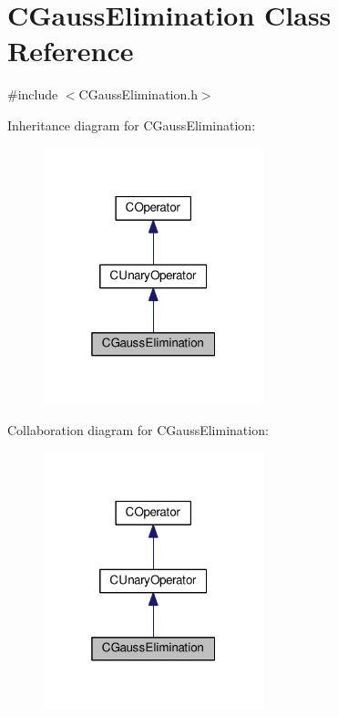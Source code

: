 \hypertarget{classCGaussElimination}{}\section{C\+Gauss\+Elimination Class Reference}
\label{classCGaussElimination}


{\ttfamily \#include $<$C\+Gauss\+Elimination.\+h$>$}



Inheritance diagram for C\+Gauss\+Elimination\+:\nopagebreak
\begin{figure}[H]
\begin{center}
\leavevmode
\includegraphics[width=181pt]{classCGaussElimination__inherit__graph}
\end{center}
\end{figure}


Collaboration diagram for C\+Gauss\+Elimination\+:\nopagebreak
\begin{figure}[H]
\begin{center}
\leavevmode
\includegraphics[width=181pt]{classCGaussElimination__coll__graph}
\end{center}
\end{figure}
